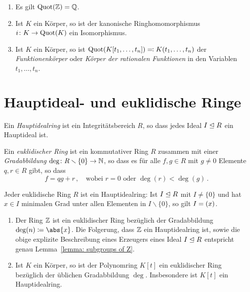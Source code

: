 \begin{example}
  \begin{enumerate}
    \item
      Es gilt $\operatorname{Quot}(\mathbb{Z}) = \mathbb{Q}$.
    \item
      Ist $K$ ein Körper, so ist der kanonische Ringhomomorphismus $i \colon K \to \operatorname{Quot}(K)$ ein Isomorphismus.
    \item
      Ist $K$ ein Körper, so ist $\operatorname{Quot}(K[t_1, \dotsc, t_n]) \eqqcolon K(t_1, \dotsc, t_n)$ der \emph{Funktionenkörper} oder \emph{Körper der rationalen Funktionen} in den Variablen $t_1, \dotsc, t_n$.
  \end{enumerate}
\end{example}





\section{Hauptideal- und euklidische Ringe}

\begin{definition}
  Ein \emph{Hauptidealring} ist ein Integritätsbereich $R$, so dass jedes Ideal $I \mathrel{\trianglelefteq} R$ ein Hauptideal ist.
\end{definition}

\begin{definition}
  Ein \emph{euklidischer Ring} ist ein kommutativer Ring $R$ zusammen mit einer \emph{Gradabbildung} $\deg \colon R \smallsetminus \{0\} \to \mathbb{N}$, so dass es für alle $f, g \in R$ mit $g \neq 0$ Elemente $q, r \in R$ gibt, so dass
  \[
    f = qg + r \,,
    \quad
    \text{wobei $r = 0$ oder $\deg(r) < \deg(g)$} \,.
  \]
\end{definition}

\begin{lemma}
  Jeder euklidische Ring $R$ ist ein Hauptidealring:
  Ist $I \mathrel{\trianglelefteq} R$ mit $I \neq \{0\}$ und hat $x \in I$ minimalen Grad unter allen Elementen in $I \smallsetminus \{0\}$, so gilt $I = (x)$.
\end{lemma}

\begin{example}
  \begin{enumerate}
    \item
      Der Ring $\mathbb{Z}$ ist ein euklidischer Ring bezüglich der Gradabbildung $\deg(n) \defined \abs{x}$.
      Die Folgerung, dass $\mathbb{Z}$ ein Hauptidealring ist, sowie die obige explizite Beschreibung eines Erzeugers eines Ideal $I \mathrel{\trianglelefteq} R$ entspricht genau Lemma~\ref{lemma: subgroups of Z}.
    \item
      Ist $K$ ein Körper, so ist der Polynomring $K[t]$ ein euklidischer Ring bezüglich der üblichen Gradabbildung $\deg$.
      Insbesondere ist $K[t]$ ein Hauptidealring.
  \end{enumerate}
\end{example}

